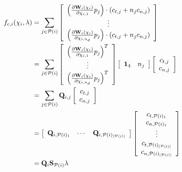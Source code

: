 \documentclass[a4paper,10pt]{article}
\begin{document}
\begin{align}
f_{c,i}(\chi_i,\lambda)
      & = \sum_{j \in \mathcal{P}(i)}\left [
\begin{array}{c}
\left( \frac{\partial\mathbf{W}_i(\chi_{i})}{\partial\chi_{i,1}}p_j \right) \cdot (c_{t,j} + n_j c_{n,j})\\
\vdots\\
\left( \frac{\partial\mathbf{W}_i(\chi_{i})}{\partial\chi_{i,n_d}}p_j \right) \cdot (c_{t,j} + n_j c_{n,j})
\end{array}
\right ]\notag\\
      & = \sum_{j \in \mathcal{P}(i)}\left [
\begin{array}{c}
\left( \frac{\partial\mathbf{W}_i(\chi_{i})}{\partial\chi_{i,1}}p_j \right)^T \\
\vdots\\
\left( \frac{\partial\mathbf{W}_i(\chi_{i})}{\partial\chi_{i,n_d}}p_j \right)^T
\end{array}
\right ]
\left [
\begin{array}{cc}
\mathbf{1}_4 \quad n_j
\end{array}
\right ]
\left [
\begin{array}{c}
c_{t,j}\\
c_{n,j}
\end{array}
\right ]\notag\\
       & = \sum_{j \in \mathcal{P}(i)} \mathbf{Q}_{i,j}
\left [
\begin{array}{c}
c_{t,j}\\
c_{n,j}
\end{array}
\right ]\notag\\
       & =
\left [
\begin{array}{ccc}
\mathbf{Q}_{i,\mathcal{P}(i)_1} &  \cdots  &  \mathbf{Q}_{i,\mathcal{P}(i)_{|\mathcal{P}(i)|}}
\end{array}
\right ]
\left [
\begin{array}{c}
c_{t,\mathcal{P}(i)_1}\\
c_{n,\mathcal{P}(i)_1}\\
\vdots \\
c_{t,\mathcal{P}(i)_{|\mathcal{P}(i)|}}\\
c_{n,\mathcal{P}(i)_{|\mathcal{P}(i)|}}
\end{array}
\right ]\notag \\
       & =
\mathbf{Q}_i \mathbf{S}_{\mathcal{P}(i)} \lambda
\end{align}
\end{document}
